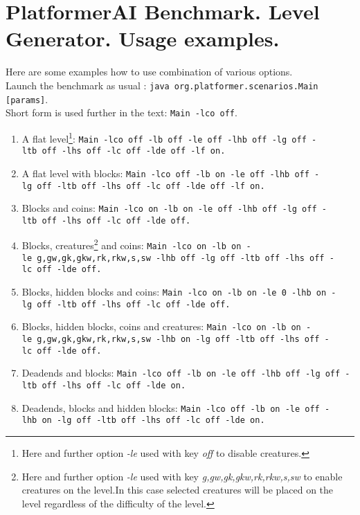 \documentclass{report}
\begin{document}
\section*{PlatformerAI Benchmark. Level Generator. Usage examples.}
Here are some examples how to use combination of various options. \\
Launch the benchmark as usual : \texttt{java~org.platformer.scenarios.Main [params]}. \\ Short form is used further in the text: \texttt{Main -lco off}.
\begin{enumerate}
\item A flat level\footnote{Here and further option \emph{-le} used with key \emph{off} to disable creatures.}: \newline %
\texttt{Main~-lco~off~-lb~off~-le~off~-lhb~off~-lg~off~-ltb~off~-lhs~off~-lc~off~-lde~off~-lf~on.}
\item A flat level with blocks:\newline %
\texttt{Main~-lco~off~-lb~on~-le~off~-lhb~off~-lg~off~-ltb~off~-lhs~off~-lc~off~-lde~off~-lf~on.}
\item Blocks and coins:\newline %
\texttt{Main~-lco~on~-lb~on~-le~off~-lhb~off~-lg~off~-ltb~off~-lhs~off~-lc~off~-lde~off.}
\item Blocks, creatures\footnote{Here and further option \emph{-le} used with key \emph{g,gw,gk,gkw,rk,rkw,s,sw} to enable creatures on the level.In this case selected creatures will be placed on the level regardless of the difficulty of the level.} and coins:\newline %
\texttt{Main~-lco~on~-lb~on~-le~g,gw,gk,gkw,rk,rkw,s,sw~-lhb~off~-lg~off~-ltb~off~-lhs~off~-lc~off~-lde~off.}
\item Blocks, hidden blocks and coins:\newline %
\texttt{Main~-lco~on~-lb~on~-le~0~-lhb~on~-lg~off~-ltb~off~-lhs~off~-lc~off~-lde~off.}
\item Blocks, hidden blocks, coins and creatures:\newline %
\texttt{Main~-lco~on~-lb~on~-le~g,gw,gk,gkw,rk,rkw,s,sw~-lhb~on~-lg~off~-ltb~off~-lhs~off~-lc~off~-lde~off.}
\item Deadends  and blocks:\newline %
\texttt{Main~-lco~off~-lb~on~-le~off~-lhb~off~-lg~off~-ltb~off~-lhs~off~-lc~off~-lde~on.}
\item Deadends, blocks and hidden blocks:\newline %
\texttt{Main~-lco~off~-lb~on~-le~off~-lhb~on~-lg~off~-ltb~off~-lhs~off~-lc~off~-lde~on.}

\end{enumerate}
\end{document}
